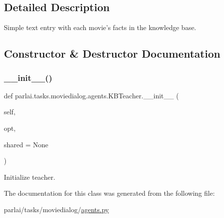\subsection{Detailed Description}
\begin{DoxyVerb}Simple text entry with each movie's facts in the knowledge base.
\end{DoxyVerb}
 

\subsection{Constructor \& Destructor Documentation}
\mbox{\label{classparlai_1_1tasks_1_1moviedialog_1_1agents_1_1KBTeacher_a3b8e113d7035a814bf991562b2e2b799}} 
\subsubsection{\texorpdfstring{\+\_\+\+\_\+init\+\_\+\+\_\+()}{\_\_init\_\_()}}
{\footnotesize\ttfamily def parlai.\+tasks.\+moviedialog.\+agents.\+K\+B\+Teacher.\+\_\+\+\_\+init\+\_\+\+\_\+ (\begin{DoxyParamCaption}\item[{}]{self,  }\item[{}]{opt,  }\item[{}]{shared = {\ttfamily None} }\end{DoxyParamCaption})}

\begin{DoxyVerb}Initialize teacher.
\end{DoxyVerb}
 

The documentation for this class was generated from the following file\+:\begin{DoxyCompactItemize}
\item 
parlai/tasks/moviedialog/\hyperlink{parlai_2tasks_2moviedialog_2agents_8py}{agents.\+py}\end{DoxyCompactItemize}
